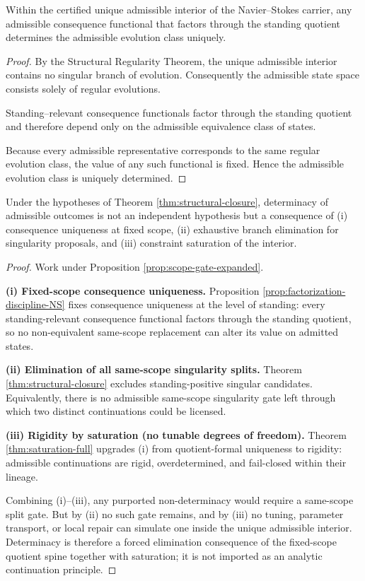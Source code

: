 \begin{lemma}
\label{lem:determinacy-bridge}
Within the certified unique admissible interior of the Navier--Stokes carrier,
any admissible consequence functional that factors through the standing
quotient determines the admissible evolution class uniquely.
\end{lemma}

\begin{proof}
By the Structural Regularity Theorem, the unique admissible interior contains
no singular branch of evolution. Consequently the admissible state
space consists solely of regular evolutions.

Standing--relevant consequence functionals factor through the standing
quotient and therefore depend only on the admissible equivalence class
of states.

Because every admissible representative corresponds to the same regular
evolution class, the value of any such functional is fixed. Hence the
admissible evolution class is uniquely determined.
\end{proof}



\begin{corollary}\label{cor:determinacy-forced}
Under the hypotheses of Theorem \ref{thm:structural-closure}, determinacy of admissible outcomes is
not an independent hypothesis but a consequence of (i) consequence uniqueness at fixed scope, (ii)
exhaustive branch elimination for singularity proposals, and (iii) constraint saturation of the
interior.
\end{corollary}

\begin{proof}
Work under Proposition \ref{prop:scope-gate-expanded}.

\textbf{(i) Fixed-scope consequence uniqueness.} Proposition
\ref{prop:factorization-discipline-NS} fixes consequence uniqueness at the level of standing: every
standing-relevant consequence functional factors through the standing quotient, so no non-equivalent
same-scope replacement can alter its value on admitted states.

\textbf{(ii) Elimination of all same-scope singularity splits.} Theorem
\ref{thm:structural-closure} excludes standing-positive singular candidates. Equivalently, there is
no admissible same-scope singularity gate left through which two distinct continuations could be
licensed.

\textbf{(iii) Rigidity by saturation (no tunable degrees of freedom).} Theorem
\ref{thm:saturation-full} upgrades (i) from quotient-formal uniqueness to rigidity: admissible
continuations are rigid, overdetermined, and fail-closed within their lineage.

Combining (i)–(iii), any purported non-determinacy would require a same-scope split gate. But by (ii)
no such gate remains, and by (iii) no tuning, parameter transport, or local repair can simulate one
inside the unique admissible interior. Determinacy is therefore a forced elimination consequence of the
fixed-scope quotient spine together with saturation; it is not imported as an analytic continuation
principle.
\end{proof}

